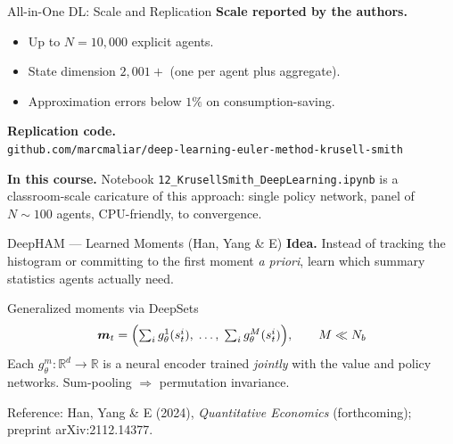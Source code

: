 \documentclass[aspectratio=169,11pt]{beamer}
\newcommand{\emphc}[1]{\textcolor{harvardcrimson}{#1}}
\newcommand{\R}{\mathbb{R}}
\begin{document}
\begin{frame}{All-in-One DL: Scale and Replication}
\small
\textbf{Scale reported by the authors.}
\begin{itemize}\itemsep1pt
    \item Up to $N = 10{,}000$ explicit agents.
    \item State dimension $2{,}001+$ (one per agent plus aggregate).
    \item Approximation errors below $1\%$ on consumption-saving.
\end{itemize}

\vspace{0.4em}
\textbf{Replication code.}\\
\texttt{github.com/marcmaliar/deep-learning-euler-method-krusell-smith}

\vspace{0.4em}
\textbf{In this course.}  Notebook \texttt{12\_KrusellSmith\_DeepLearning.ipynb} is a classroom-scale caricature of this approach: single policy network, panel of $N \sim 100$ agents, CPU-friendly,  to convergence.
\end{frame}

\begin{frame}{DeepHAM --- Learned Moments (Han, Yang \& E)}
\small
\textbf{Idea.}  Instead of tracking the histogram or committing to the first moment \emph{a priori}, \emphc{learn} which summary statistics agents actually need.

\vspace{0.4em}
\begin{block}{Generalized moments via DeepSets}
\footnotesize
\begin{equation*}
\bm{m}_t = \Bigl(\textstyle\sum_i g_\theta^1(s_t^i),\; \ldots,\; \sum_i g_\theta^M(s_t^i)\Bigr), \qquad M \ll N_b
\end{equation*}
Each $g_\theta^m:\R^d\!\to\!\R$ is a neural encoder trained \emph{jointly} with the value and policy networks.  Sum-pooling $\Rightarrow$ permutation invariance.
\end{block}

\vspace{0.4em}
{\scriptsize Reference: Han, Yang \& E (2024), \emph{Quantitative Economics} (forthcoming); preprint arXiv:2112.14377.}
\end{frame}
\end{document}
